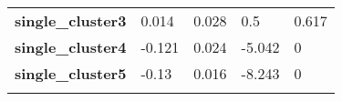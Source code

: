 \documentclass[]{article}
\begin{document}
\begin{longtable}[c]{@{}lllll@{}}
\begin{minipage}[t]{0.31\columnwidth}\raggedright\strut
\textbf{single\_cluster3}
\strut\end{minipage} &
\begin{minipage}[t]{0.13\columnwidth}\raggedright\strut
0.014
\strut\end{minipage} &
\begin{minipage}[t]{0.16\columnwidth}\raggedright\strut
0.028
\strut\end{minipage} &
\begin{minipage}[t]{0.12\columnwidth}\raggedright\strut
0.5
\strut\end{minipage} &
\begin{minipage}[t]{0.12\columnwidth}\raggedright\strut
0.617
\strut\end{minipage}\tabularnewline
\begin{minipage}[t]{0.31\columnwidth}\raggedright\strut
\textbf{single\_cluster4}
\strut\end{minipage} &
\begin{minipage}[t]{0.13\columnwidth}\raggedright\strut
-0.121
\strut\end{minipage} &
\begin{minipage}[t]{0.16\columnwidth}\raggedright\strut
0.024
\strut\end{minipage} &
\begin{minipage}[t]{0.12\columnwidth}\raggedright\strut
-5.042
\strut\end{minipage} &
\begin{minipage}[t]{0.12\columnwidth}\raggedright\strut
0
\strut\end{minipage}\tabularnewline
\begin{minipage}[t]{0.31\columnwidth}\raggedright\strut
\textbf{single\_cluster5}
\strut\end{minipage} &
\begin{minipage}[t]{0.13\columnwidth}\raggedright\strut
-0.13
\strut\end{minipage} &
\begin{minipage}[t]{0.16\columnwidth}\raggedright\strut
0.016
\strut\end{minipage} &
\begin{minipage}[t]{0.12\columnwidth}\raggedright\strut
-8.243
\strut\end{minipage} &
\begin{minipage}[t]{0.12\columnwidth}\raggedright\strut
0
\strut\end{minipage}\tabularnewline
\begin{minipage}[t]{0.31\columnwidth}\raggedright\strut

\end{minipage}
\end{longtable}
\end{document}
